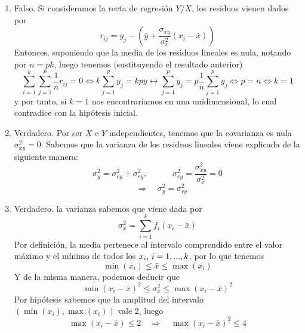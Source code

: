 \documentclass[fleqn]{article}
\def\next{\quad \Rightarrow \quad}
\begin{document}
\begin{enumerate}
\begin{enumerate}
                                \item Falso. Si consideramos la recta de regresión $Y/X$, los residuos vienen dados por
                                                $$r_{ij} = y_j - \left( \bar{y} + \frac{\sigma_{xy}}{\sigma_x ^2} (x_i - \bar{x})\right)$$
                                                Entonces, suponiendo que la media de los residuos lineales es nula, notando por $n=pk$, luego tenemos 
                                                (sustituyendo el resultado anterior)
                                                $$\sum_{i=1}^k \sum_{j=1}^p \frac{1}{n}r_{ij} = 0 \Leftrightarrow k \sum_{j=1}^p y_j = kp \bar{y}
                                                \leftrightarrow \sum_{j=1}^p y_j = p \frac{1}{n} \sum_{j=1}^p y_j \Leftrightarrow p=n \Leftrightarrow k=1$$
                                                y por tanto, si $k=1$ nos encontraríamos en una unidimensional, lo cual contradice con la hipótesis inicial.\\
                                \item Verdadero. Por ser $ X $ e $Y$ independientes, tenemos que la covarianza es nula $\sigma_{xy}^2  = 0$. Sabemos que la varianza de los residuos 
                                                lineales viene explicada de la siguiente manera:
                                                $$\sigma_y^2 = \sigma_{ey}^2 + \sigma_{ry}^2, \quad \quad \quad \sigma_{ey}^2 = \frac{\sigma_{xy}^2}{\sigma_x^2} = 0$$
                                                $$\next \sigma_y^2 = \sigma_{ry}^2$$
                                \item Verdadero. la varianza sabemos que viene dada por 
                                                $$\sigma_x^2 = \sum_{i=1}^k f_i(x_i - \bar{x})$$
                                                Por definición, la media pertenece al intervalo comprendido entre el valor máximo y el mínimo de todos los $x_i, \thinspace i=1,...,k$.
                                                por lo que tenemos
                                                $$\min(x_i) \leq \bar{x} \leq \max(x_i)$$
                                                Y de la misma manera, podemos deducir que 
                                                $$\min(x_i - \bar{x})^2 \leq \sigma_x^2 \leq \max(x_i - \bar{x})^2$$
                                                Por hipótesis sabemos que la amplitud del intervalo $(\min(x_i), \max(x_i))$ vale 2, luego
                                                $$\max(x_i - \bar{x}) \leq 2 \next \max(x_i - \bar{x})^2 \leq 4$$

\end{enumerate}
\end{enumerate}
\end{document}
